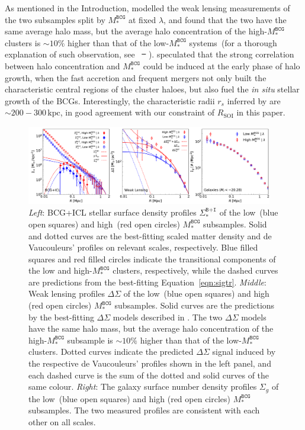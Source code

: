 \documentclass[fleqn,usenatbib]{mnras}
\newcommand{\rsoi}{R_{\mathrm{SOI}}}
\newcommand{\sigbi}{\Sigma_*^{\texttt{B+I}}}
\newcommand{\sigg}{\Sigma_g}
\newcommand{\msbcg}{M_*^{\texttt{BCG}}}
\newcommand{\kpc}{\mathrm{kpc}}
\newcommand{\ds}{\Delta\Sigma}
\providecommand{\DIFaddtex}[1]{{\protect\color{blue}\uwave{#1}}} %
\providecommand{\DIFdeltex}[1]{{\protect\color{red}\sout{#1}}}                      %
\providecommand{\DIFaddbegin}{} %
\providecommand{\DIFaddend}{} %
\providecommand{\DIFdelbegin}{} %
\providecommand{\DIFdelend}{} %
\providecommand{\DIFadd}[1]{\texorpdfstring{\DIFaddtex{#1}}{#1}} %
\providecommand{\DIFdel}[1]{\texorpdfstring{\DIFdeltex{#1}}{}} %
\newcommand{\DIFscaledelfig}{0.5}
\newlength{\DIFdelgraphicswidth} %
\newlength{\DIFdelgraphicsheight} %
\newcommand{\DIFaddincludegraphics}[2][]{{\color{blue}\fbox{\DIFOincludegraphics[#1]{#2}}}} %
\newcommand{\DIFdelincludegraphics}[2][]{%
\sbox{\DIFdelgraphicsbox}{\DIFOincludegraphics[#1]{#2}}%
\settoboxwidth{\DIFdelgraphicswidth}{\DIFdelgraphicsbox} %
\settoboxtotalheight{\DIFdelgraphicsheight}{\DIFdelgraphicsbox} %
\scalebox{\DIFscaledelfig}{%
\parbox[b]{\DIFdelgraphicswidth}{\usebox{\DIFdelgraphicsbox}\\[-\baselineskip] \rule{\DIFdelgraphicswidth}{0em}}\llap{\resizebox{\DIFdelgraphicswidth}{\DIFdelgraphicsheight}{%
\setlength{\unitlength}{\DIFdelgraphicswidth}%
\begin{picture}(1,1)%
\thicklines\linethickness{2pt} %
{\color[rgb]{1,0,0}\put(0,0){\framebox(1,1){}}}%
{\color[rgb]{1,0,0}\put(0,0){\line( 1,1){1}}}%
{\color[rgb]{1,0,0}\put(0,1){\line(1,-1){1}}}%
\end{picture}%
}\hspace*{3pt}}} %
} %
\DeclareRobustCommand{\DIFaddbegin}{\DIFOaddbegin \let\includegraphics\DIFaddincludegraphics} %
\DeclareRobustCommand{\DIFaddend}{\DIFOaddend \let\includegraphics\DIFOincludegraphics} %
\DeclareRobustCommand{\DIFdelbegin}{\DIFOdelbegin \let\includegraphics\DIFdelincludegraphics} %
\DeclareRobustCommand{\DIFdelend}{\DIFOaddend \let\includegraphics\DIFOincludegraphics} %
\begin{document}
As mentioned in the Introduction,  modelled the weak
lensing measurements of the two subsamples split by $\msbcg$ at fixed
$\lambda$, and found that the two have the same average halo mass, but the
average halo concentration of the high-$\msbcg$ clusters is
${\sim}10\%$ higher than that of the low-$\msbcg$ systems~(for a thorough
explanation of such observation, see ~\DIFdelbegin \DIFdel{\mbox{%
\citet{Zu2021b}}\hspace{0pt}%
}\DIFdelend \DIFaddbegin \DIFadd{\mbox{%
\citet{Zu2022}}\hspace{0pt}%
}\DIFaddend ).
 speculated that the strong correlation between halo
concentration and $\msbcg$ could be induced at the early phase of halo
growth, when the fast accretion and frequent mergers not only built the
characteristic central regions of the cluster haloes, but also fuel the {\it in situ}
stellar growth of the BCGs. Interestingly, the characteristic radii $r_s$
inferred by  are ${\sim}200{-}300\,\kpc$, in good
agreement with our constraint of $\rsoi$ in this paper.


\begin{figure}
    \centering\includegraphics[width=0.96\textwidth]{fig/subsamples_SB_SM.pdf}
    \caption{{\it Left}: BCG+ICL stellar surface density profiles $\sigbi$
    of the low~(blue open squares) and high~(red open circles) $\msbcg$
    subsamples. Solid and dotted curves are the best-fitting scaled matter
    density and de Vaucouleurs' profiles on relevant scales, respectively.
    Blue filled squares and red filled circles indicate the transitional
    components of the low and high-$\msbcg$ clusters, respectively, while
    the dashed curves are predictions from the best-fitting
    Equation~\ref{eqn:sigtr}.  {\it Middle}: Weak lensing profiles $\ds$ of
    the low~(blue open squares) and high (red open circles) $\msbcg$
    subsamples. Solid curves are the predictions by the best-fitting $\ds$
    models described in . The two $\ds$ models have the
    same halo mass, but the average halo concentration of the high-$\msbcg$
    subsample is ${\sim}10\%$ higher than that of the low-$\msbcg$ clusters. Dotted
    curves indicate the predicted $\ds$ signal induced by the respective de
    Vaucouleurs' profiles shown in the left panel, and each dashed curve is
    the sum of the dotted and solid curves of the same colour.  {\it
    Right}: The galaxy surface number density profiles $\sigg$ of the
    low~(blue open squares) and high (red open circles) $\msbcg$
    subsamples. The two measured profiles are consistent with each other on
    all scales.  \label{fig:subdecomposition}}
\end{figure}
\end{document}
